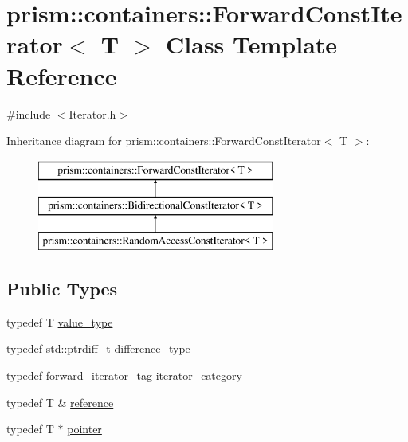 \hypertarget{classprism_1_1containers_1_1_forward_const_iterator}{}\section{prism\+:\+:containers\+:\+:Forward\+Const\+Iterator$<$ T $>$ Class Template Reference}
\label{classprism_1_1containers_1_1_forward_const_iterator}


{\ttfamily \#include $<$Iterator.\+h$>$}

Inheritance diagram for prism\+:\+:containers\+:\+:Forward\+Const\+Iterator$<$ T $>$\+:\begin{figure}[H]
\begin{center}
\leavevmode
\includegraphics[height=3.000000cm]{classprism_1_1containers_1_1_forward_const_iterator}
\end{center}
\end{figure}
\subsection*{Public Types}
\begin{DoxyCompactItemize}
\item 
typedef T \hyperlink{classprism_1_1containers_1_1_forward_const_iterator_a2916b21d808304bd4f1ae3de17f65d06}{value\+\_\+type}
\item 
typedef std\+::ptrdiff\+\_\+t \hyperlink{classprism_1_1containers_1_1_forward_const_iterator_ad3dab41615afe9dba6b9a2e88721b1da}{difference\+\_\+type}
\item 
typedef \hyperlink{structprism_1_1containers_1_1forward__iterator__tag}{forward\+\_\+iterator\+\_\+tag} \hyperlink{classprism_1_1containers_1_1_forward_const_iterator_a9409b1e2a779ce14a469e25944753dbe}{iterator\+\_\+category}
\item 
typedef T \& \hyperlink{classprism_1_1containers_1_1_forward_const_iterator_a9580e2fada8484b568a7fc3e104dbf1e}{reference}
\item 
typedef T $\ast$ \hyperlink{classprism_1_1containers_1_1_forward_const_iterator_a947740c6995919fd5e772a553dda7735}{pointer}
\end{DoxyCompactItemize}
